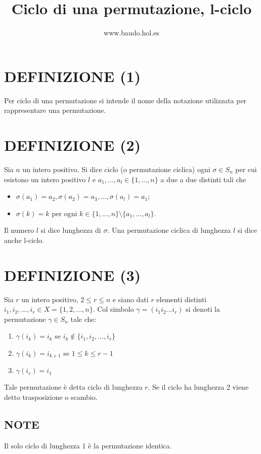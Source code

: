 \documentclass[a4paper,10pt]{article}
\title{Ciclo di una permutazione, l-ciclo}
\author{www.baudo.hol.es}
\begin{document}
\maketitle

\section{DEFINIZIONE (1)}
Per ciclo di una permutazione si intende il nome della notazione utilizzata per rappresentare una permutazione.

\section{DEFINIZIONE (2)}
Sia $n$ un intero positivo. Si dice ciclo (o permutazione ciclica) ogni $\sigma \in S_n$ per cui esistono un intero
positivo $l$ e $a_1, ..., a_l \in \{1, ..., n\}$ a due a due distinti tali che
\begin{itemize}
 \item $\sigma(a_1)=a_2, \sigma(a_2)=a_3, ..., \sigma(a_l)=a_1$;
 \item $\sigma(k)=k$ per ogni $k \in \{1, ..., n\} \setminus \{a_1, ..., a_l\}$.
\end{itemize}
Il numero $l$ si dice lunghezza di $\sigma$. Una permutazione ciclica di lunghezza $l$ si dice anche l-ciclo.

\section{DEFINIZIONE (3)}
Sia $r$ un intero positivo, $2 \leq r \leq n $ e siano dati $r$ elementi distinti $i_1, i_2, ..., i_r \in X=\{1,2,...,n\}$.
Col simbolo $\gamma = (i_1 i_2 ... i_r)$ si denoti la permutazione $\gamma \in S_n$ tale che:
\begin{enumerate}
 \item $\gamma (i_k) = i_k$ se $i_k \notin \{i_1, i_2, ..., i_r\}$
 \item $\gamma(i_k)=i_{k+1}$ se $1 \leq k \leq r-1$
 \item $\gamma (i_r)=i_1$
\end{enumerate}
Tale permutazione è detta ciclo di lunghezza $r$.
Se il ciclo ha lunghezza 2 viene detto trasposizione o scambio.

\subsection{NOTE}
Il solo ciclo di lunghezza 1 è la permutazione identica.
\end{document}
